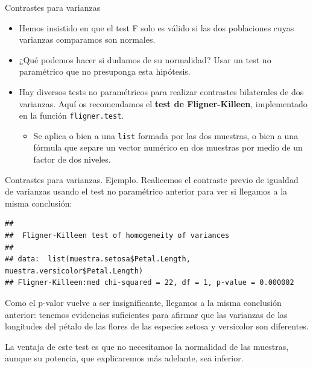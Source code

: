 \documentclass[
  ignorenonframetext,
]{beamer}
\newenvironment{Shaded}{\begin{snugshade}}{\end{snugshade}}
\newcommand{\KeywordTok}[1]{\textcolor[rgb]{0.13,0.29,0.53}{\textbf{#1}}}
\newcommand{\NormalTok}[1]{#1}
\newcommand{\OperatorTok}[1]{\textcolor[rgb]{0.81,0.36,0.00}{\textbf{#1}}}
\providecommand{\tightlist}{%
  \setlength{\itemsep}{0pt}\setlength{\parskip}{0pt}}
\begin{document}
\begin{frame}[fragile]{Contrastes para varianzas}
\protect\hypertarget{contrastes-para-varianzas}{}
\begin{itemize}[<+->]
\item
  Hemos insistido en que el test F solo es válido si las dos poblaciones
  cuyas varianzas comparamos son normales.
\item
  ¿Qué podemos hacer si dudamos de su normalidad? Usar un test no
  paramétrico que no presuponga esta hipótesis.
\item
  Hay diversos tests no paramétricos para realizar contrastes
  bilaterales de dos varianzas. Aquí os recomendamos el \textbf{test de
  Fligner-Killeen}, implementado en la función \texttt{fligner.test}.

  \begin{itemize}[<+->]
  \tightlist
  \item
    Se aplica o bien a una \texttt{list} formada por las dos muestras, o
    bien a una fórmula que separe un vector numérico en dos muestras por
    medio de un factor de dos niveles.
  \end{itemize}
\end{itemize}
\end{frame}

\begin{frame}[fragile]{Contrastes para varianzas. Ejemplo.}
\protect\hypertarget{contrastes-para-varianzas.-ejemplo.}{}
Realicemos el contraste previo de igualdad de varianzas usando el test
no paramétrico anterior para ver si llegamos a la misma conclusión:

\begin{Shaded}
\end{Shaded}

\begin{verbatim}
## 
##  Fligner-Killeen test of homogeneity of variances
## 
## data:  list(muestra.setosa$Petal.Length, muestra.versicolor$Petal.Length)
## Fligner-Killeen:med chi-squared = 22, df = 1, p-value = 0.000002
\end{verbatim}

Como el p-valor vuelve a ser insignificante, llegamos a la misma
conclusión anterior: tenemos evidencias suficientes para afirmar que las
varianzas de las longitudes del pétalo de las flores de las especies
setosa y versicolor son diferentes.

La ventaja de este test es que no necesitamos la normalidad de las
muestras, aunque su potencia, que explicaremos más adelante, sea
inferior.
\end{frame}
\end{document}
